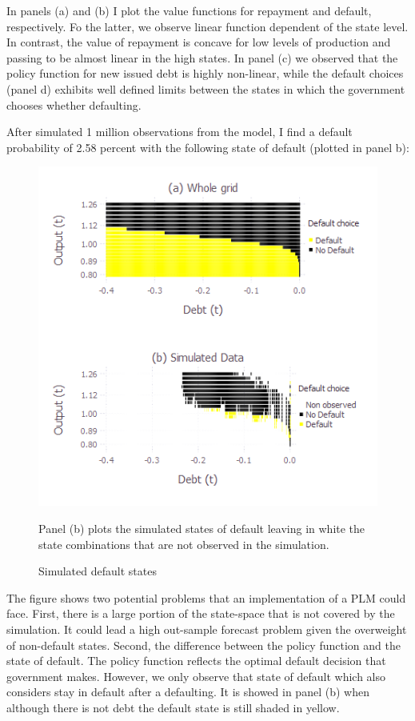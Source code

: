 \documentclass[12pt, a4paper]{article}
\begin{document}
\par In panels (a) and (b) I plot the value functions for repayment and default, respectively. Fo the latter, we observe linear function dependent of the state level. In contrast, the value of repayment is concave for low levels of production and passing to be almost linear in the high states. In panel (c) we observed that the policy function for new issued debt is highly non-linear, while the default choices (panel d) exhibits well defined limits between the states in which the government chooses whether defaulting.\\
\par After simulated 1 million observations from the model, I find a default probability of 2.58 percent with the following state of default (plotted in panel b):
\begin{figure}[!hbt]
	\centering
	\caption{Simulated default states}
	\includegraphics[scale=0.86]{../Plots/heat1.png}
	\begin{minipage}{0.65\textwidth}
		{\scriptsize Panel (b) plots the simulated states of default leaving in white the state combinations that are not observed in the simulation.\par}
	\end{minipage}
\end{figure}
The figure shows two potential problems that an implementation of a PLM could face. First, there is a large portion of the state-space that is not covered by the simulation. It could lead a high out-sample forecast problem given the overweight of non-default states. Second, the difference between the policy function and the state of default. The policy function reflects the optimal default decision that government makes. However, we only observe that state of default which also considers stay in default after a defaulting. It is showed in panel (b) when although there is not debt the default state is still shaded in yellow. 
\end{document}
